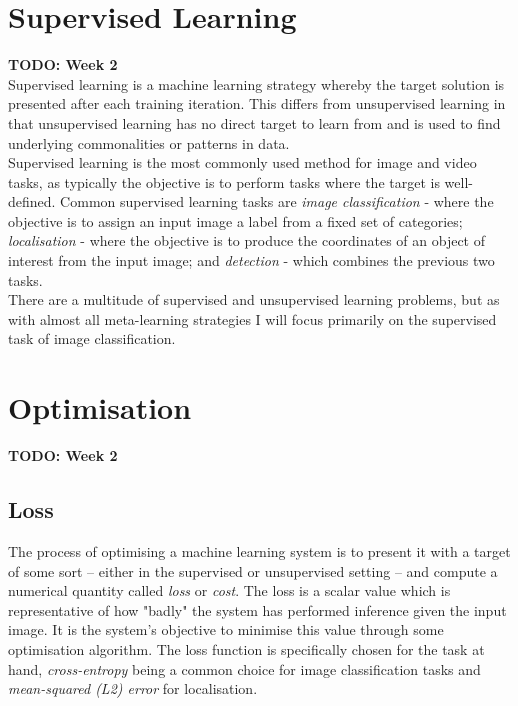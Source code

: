 \documentclass{report}
\begin{document}
	\section{Supervised Learning}
	\textbf{TODO: Week 2} \\
	Supervised learning is a machine learning strategy whereby the target solution is presented after each training iteration. This differs from unsupervised learning in that unsupervised learning has no direct target to learn from and is used to find underlying commonalities or patterns in data. \\
	Supervised learning is the most commonly used method for image and video tasks, as typically the objective is to perform tasks where the target is well-defined. Common supervised learning tasks are \textit{image classification} - where the objective is to assign an input image a label from a fixed set of categories; \textit{localisation} - where the objective is to produce the coordinates of an object of interest from the input image; and \textit{detection} - which combines the previous two tasks. \\
	There are a multitude of supervised and unsupervised learning problems, but as with almost all meta-learning strategies I will focus primarily on the supervised task of image classification.
	

	\section{Optimisation}
	\textbf{TODO: Week 2} \\
	\subsection{Loss}
	The process of optimising a machine learning system is to present it with a target of some sort -- either in the supervised or unsupervised setting -- and compute a numerical quantity called \textit{loss} or \textit{cost}. The loss is a scalar value which is representative of how "badly" the system has performed inference given the input image. It is the system's objective to minimise this value through some optimisation algorithm. The loss function is specifically chosen for the task at hand, \textit{cross-entropy} being a common choice for image classification tasks and \textit{mean-squared (L2) error}  for localisation. \\
	
\end{document}
